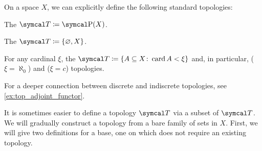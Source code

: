 \begin{definition}\label{def:standard_topologies}
  On a space \( X \), we can explicitly define the following standard topologies:
  \begin{defenum}
    \item\label{def:standard_topologies/discrete} The  \( \Cal{T} \coloneqq \Power(X) \).
    \item\label{def:standard_topologies/indiscrete} The  \( \Cal{T} \coloneqq \{ \varnothing, X \} \).
    \item\label{def:standard_topologies/co_cardinal} For any cardinal \( \xi \), the  \( \Cal{T} \coloneqq \{ A \subseteq X \colon \Card A < \xi \} \) and, in particular,  (\( \xi = \aleph_0 \)) and  (\( \xi = c \)) topologies.
  \end{defenum}

  For a deeper connection between discrete and indiscrete topologies, see \cref{ex:top_adjoint_functor}.
\end{definition}

\begin{note}\label{note:abritrary_family_to_topology}
  It is sometimes easier to define a topology \( \Cal{T} \) via a subset of \( \Cal{T} \). We will gradually construct a topology from a bare family of sets in \( X \). First, we will give two definitions for a base, one on which does not require an existing topology.
\end{note}

